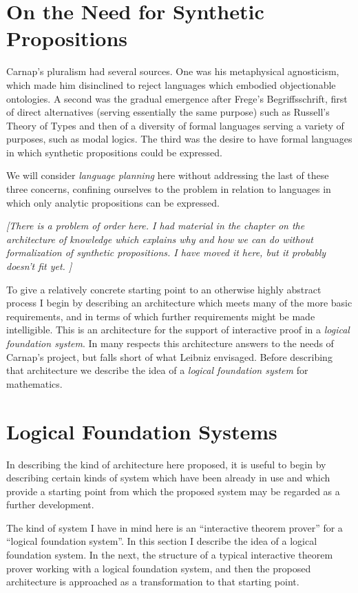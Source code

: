 \section{On the Need for Synthetic Propositions}

Carnap's pluralism had several sources.
One was his metaphysical agnosticism, which made him disinclined to
reject languages which embodied objectionable ontologies.
A second was the gradual emergence after Frege's Begriffsschrift,
first of direct alternatives (serving essentially the same purpose)
such as Russell's Theory of Types and then of a diversity of formal
languages serving a variety of purposes, such as modal logics.
The third was the desire to have formal languages in which synthetic
propositions could be expressed.

We will consider \emph{language planning} here without addressing the
last of these three concerns, confining ourselves to the problem in
relation to languages in which only analytic propositions can be
expressed.

{\it
[There is a problem of order here.
I had material in the chapter on the architecture of
knowledge which explains why and how we can do without formalization
of synthetic propositions.
I have moved it here, but it probably doesn't fit yet.
]
}%


To give a relatively concrete starting point to an otherwise highly
abstract process I begin by describing an architecture which meets
many of the more basic requirements, and in terms of which further
requirements might be made intelligible. 
This is an architecture for the support of interactive proof in a
\emph{logical foundation system}. 
In many respects this architecture answers to the needs of Carnap's
project, but falls short of what Leibniz envisaged. 
Before describing that architecture we describe the idea of a
\emph{logical foundation system} for mathematics.

\section{Logical Foundation Systems}

In describing the kind of architecture here proposed, it is useful to
begin by describing certain kinds of system which have been already in
use and which provide a starting point from which the proposed system
may be regarded as a further development.

The kind of system I have in mind here is an ``interactive theorem
prover'' for a ``logical foundation system''.
In this section I describe the idea of a logical foundation system.
In the next, the structure of a typical interactive theorem prover
working with a logical foundation system, and then the proposed
architecture is approached as a transformation to that starting point.

